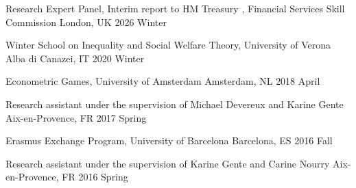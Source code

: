 
\begin{cvhonors}

  \cvhonor
    {Research Expert Panel, Interim report to HM Treasury {\normalfont,}} %
    {Financial Services Skill Commission} %
    {London, UK} %
    {2026 Winter} %
    
  \cvhonor
    {Winter School on Inequality and Social Welfare Theory{\normalfont,}} %
    {University of Verona} %
    {Alba di Canazei, IT} %
    {2020 Winter} %
    
  \cvhonor
    {Econometric Games{\normalfont,}} %
    {University of Amsterdam} %
    {Amsterdam, NL} %
    {2018 April} %
    
  \cvhonor
    {Research assistant{\normalfont}} %
    {under the supervision of Michael Devereux and Karine Gente} %
    {Aix-en-Provence, FR} %
    {2017 Spring} %
    
  \cvhonor
    {Erasmus Exchange Program{\normalfont,}} %
    {University of Barcelona} %
    {Barcelona, ES} %
    {2016 Fall} %

  \cvhonor
    {Research assistant{\normalfont}} %
    {under the supervision of Karine Gente and Carine Nourry} %
    {Aix-en-Provence, FR} %
    {2016 Spring} %
    


\end{cvhonors}